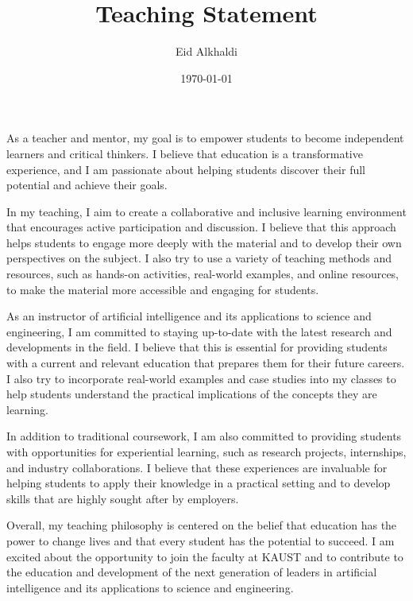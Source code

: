 \documentclass[11pt]{article}
\author{Eid Alkhaldi}
\date{\today}
\title{Teaching Statement}
\begin{document}
\maketitle
As a teacher and mentor, my goal is to empower students to become independent learners and critical thinkers. I believe that education is a transformative experience, and I am passionate about helping students discover their full potential and achieve their goals.

In my teaching, I aim to create a collaborative and inclusive learning environment that encourages active participation and discussion. I believe that this approach helps students to engage more deeply with the material and to develop their own perspectives on the subject. I also try to use a variety of teaching methods and resources, such as hands-on activities, real-world examples, and online resources, to make the material more accessible and engaging for students.

As an instructor of artificial intelligence and its applications to science and engineering, I am committed to staying up-to-date with the latest research and developments in the field. I believe that this is essential for providing students with a current and relevant education that prepares them for their future careers. I also try to incorporate real-world examples and case studies into my classes to help students understand the practical implications of the concepts they are learning.

In addition to traditional coursework, I am also committed to providing students with opportunities for experiential learning, such as research projects, internships, and industry collaborations. I believe that these experiences are invaluable for helping students to apply their knowledge in a practical setting and to develop skills that are highly sought after by employers.

Overall, my teaching philosophy is centered on the belief that education has the power to change lives and that every student has the potential to succeed. I am excited about the opportunity to join the faculty at KAUST and to contribute to the education and development of the next generation of leaders in artificial intelligence and its applications to science and engineering.
\end{document}

